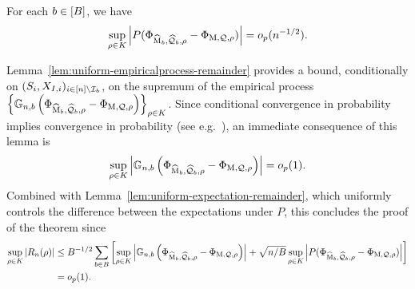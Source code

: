 \begin{lemma}
\label{lem:uniform-expectation-remainder}
For each $b \in [B]$, we have
\begin{align*}
\sup_{\rho \in K} \left|P(\Phi_{\widehat{\operatorname*{M}}_b, \widehat{\mathcal{Q}}_b, \rho} - \Phi_{\operatorname*{M},  \mathcal{Q}, \rho}) \right| = o_p(n^{-1/2}).
\end{align*}
\end{lemma}
Lemma~\ref{lem:uniform-empiricalprocess-remainder} provides a bound, conditionally on $(S_i , X_{I,i})_{i \in [n] \setminus \mathcal{I}_b}$, on the supremum of the empirical process $\left\{ \mathbb{G}_{n,b}\left( \Phi_{\widehat{\operatorname*{M}}_b, \widehat{\mathcal{Q}}_b, \rho} - \Phi_{\operatorname*{M},  \mathcal{Q}, \rho} \right) \right\}_{\rho \in K}$. 
Since conditional convergence in probability implies convergence in probability (see e.g.\ \citet[Lemma 6.1]{ChernozhukovChDeDuHaNeRo16}), an immediate consequence of this lemma is
\begin{align*}
 \sup_{\rho \in K} \left|  \mathbb{G}_{n,b}\left( \Phi_{\widehat{\operatorname*{M}}_b, \widehat{\mathcal{Q}}_b, \rho} - \Phi_{\operatorname*{M},  \mathcal{Q}, \rho} \right) \right|  = o_p(1).
\end{align*}
Combined with Lemma~\ref{lem:uniform-expectation-remainder}, which uniformly controls the difference between the expectations under $P$, this concludes the proof of the theorem since 
\begin{align*}
\sup_{\rho \in K} |R_n(\rho)| &\le B^{-1/2}\sum_{b \in B} \left[  \sup_{\rho \in K} \left|  \mathbb{G}_{n,b}\left( \Phi_{\widehat{\operatorname*{M}}_b, \widehat{\mathcal{Q}}_b, \rho} - \Phi_{\operatorname*{M},  \mathcal{Q}, \rho} \right) \right| 
+ \sqrt{n/B}\sup_{\rho \in K} \left|P(\Phi_{\widehat{\operatorname*{M}}_b, \widehat{\mathcal{Q}}_b, \rho} - \Phi_{\operatorname*{M},  \mathcal{Q}, \rho}) \right|  \right] \\
&= o_p(1).
\end{align*}


